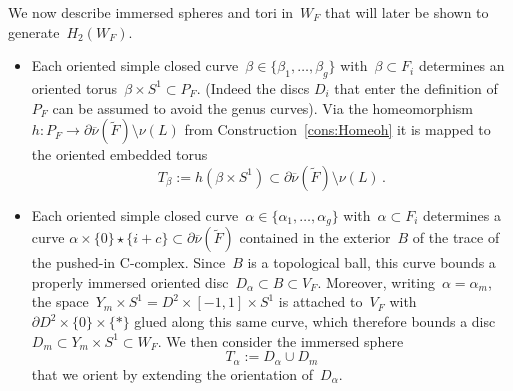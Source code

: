 \documentclass[10.9pt,a4paper]{amsart}
\theoremstyle{definition}
\theoremstyle{remark}
\newcommand{\onu}{\overline{\nu}}
\begin{document}
We now describe immersed spheres and tori in~$W_F$ that will later be shown to generate~$H_2(W_F)$.
\begin{itemize}
\item Each oriented simple closed curve~$\beta\in\{\beta_1,\dots,\beta_g\}$ with~$\beta\subset F_i$ determines an oriented torus~$\beta \times S^1 \subset P_F$.
(Indeed the discs $D_i$ that enter the definition of $P_F$ can be assumed to avoid the genus curves).
 Via the homeomorphism~$h\colon P_F \to\partial \onu(\tilde{F}) \setminus \nu(L)$ from Construction~\ref{cons:Homeoh} it is mapped to the oriented embedded torus
\[
T_{\beta} := h(\beta \times S^1) \subset \partial \onu(\tilde{F}) \setminus \nu(L)\,.
\]
\item Each oriented simple closed curve~$\alpha\in\{\alpha_1,\dots,\alpha_g\}$ with~$\alpha\subset F_i$
determines a curve $\alpha \times \{0\} \star \{i+c\}\subset\partial \onu(\tilde F)$ contained in the exterior~$B$ of the trace of the
pushed-in C-complex. Since~$B$ is a topological ball, this curve bounds a properly immersed oriented disc~$D_{\alpha}\subset B\subset V_F$. Moreover, writing~$\alpha=\alpha_m$, the space~$Y_m \times S^1=D^2\times [-1,1]\times S^1$ is attached to~$V_F$ with~$\partial D^2\times\{0\}\times \{*\}$ glued along this same curve, which therefore bounds a disc~$D_m\subset Y_m \times S^1 \subset W_F$.
We then consider the immersed sphere
\[
T_{\alpha} := D_{\alpha} \cup D_m
\]
that we orient by extending the orientation of~$D_{\alpha}$.


\end{itemize}
\end{document}
